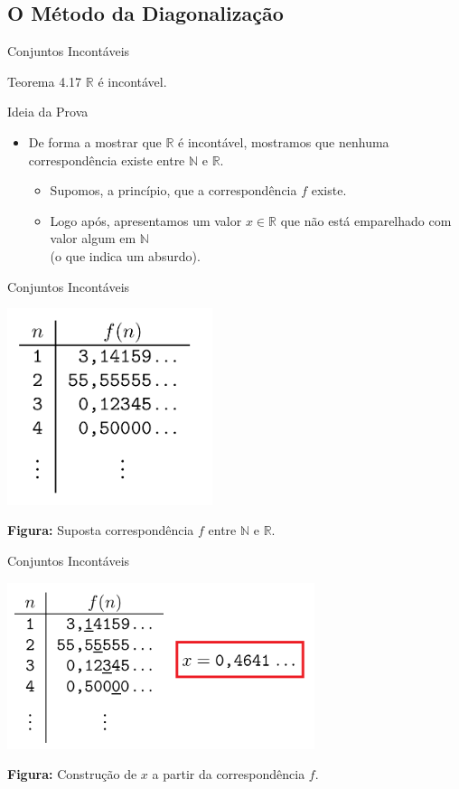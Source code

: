 \documentclass[xcolor=dvipsnames,table]{beamer}
\begin{document}
	\subsection{O Método da Diagonalização}
	\begin{frame}{Conjuntos Incontáveis}
		\begin{block}{Teorema 4.17}
			$\mathbb{R}$ é incontável.
		\end{block}
		\begin{block}{Ideia da Prova}
			\begin{itemize}
				\item De forma a mostrar que $\mathbb{R}$ é incontável, mostramos que nenhuma correspondência existe entre $\mathbb{N}$ e $\mathbb{R}$.
				\begin{itemize}
					\item Supomos, a princípio, que a correspondência $f$ existe.
					\item Logo após, apresentamos um valor $x \in \mathbb{R}$ que não está emparelhado com valor algum em $\mathbb{N}$ \\(o que indica um absurdo).				
				\end{itemize}
			\end{itemize}
		\end{block}
	\end{frame}
	
	\begin{frame}{Conjuntos Incontáveis}
		\begin{center}
    		\includegraphics[width=6cm]{images/fHip.png}
    		
    		{\bf Figura:} Suposta correspondência $f$ entre $\mathbb{N}$ e $\mathbb{R}$.
  		\end{center}
	\end{frame}
	
	\begin{frame}{Conjuntos Incontáveis}
		\begin{center}
    		\includegraphics[width=9cm]{images/fHipX.png}
    		
    		{\bf Figura:} Construção de $x$ a partir da correspondência $f$.
  		\end{center}
	\end{frame}
	
\end{document}
